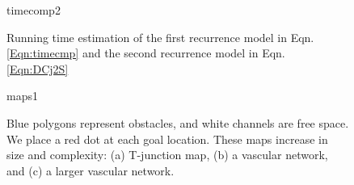 \begin{figure}[h]
	\centering
	\begin{overpic}[width=0.8\columnwidth]{timecomp2} %
	\end{overpic}
	
	\caption{\label{fig:timecom} Running time estimation of the first recurrence model in Eqn. \ref{Eqn:timecmp} and the second recurrence model in Eqn. \ref{Eqn:DCj2S} }
\end{figure}
\begin{figure}[h]

	\centering
	\begin{overpic}[width=1\columnwidth]{maps1}
	\end{overpic}
	
	\caption{\label{fig:maps} Blue polygons represent obstacles, and white channels are free space. We place a red dot at each goal location. These maps increase in size and complexity: (a) T-junction map, (b) a vascular network, and (c) a larger vascular network.} 
	\vspace{-5 mm}
\end{figure}
